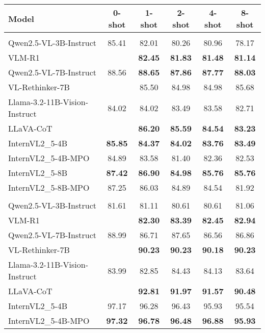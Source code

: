 \begin{table}[!h]
\centering
\small
\begin{tabular}{lccccc}
\toprule
\textbf{Model} & 0-shot & 1-shot & 2-shot & 4-shot & 8-shot \\
\midrule
\rowcolor{gray!20} \multicolumn{6}{c}{\textbf{A-OKVQA}} \\
\midrule
{Qwen2.5-VL-3B-Instruct} & 85.41 & 82.01 & 80.26 & 80.96 & 78.17 \\
{VLM-R1} &  & \textbf{82.45} & \textbf{81.83} & \textbf{81.48} & \textbf{81.14} \\
\midrule
{Qwen2.5-VL-7B-Instruct} & 88.56 & \textbf{88.65} & \textbf{87.86} & \textbf{87.77} & \textbf{88.03} \\
{VL-Rethinker-7B} &  & 85.50 & 84.98 & 84.98 & 85.68 \\
\midrule
{Llama-3.2-11B-Vision-Instruct} & 84.02 & 84.02 & 83.49 & 83.58 & 82.71 \\
{LLaVA-CoT} &  & \textbf{86.20} & \textbf{85.59} & \textbf{84.54} & \textbf{83.23} \\
\midrule
{InternVL2\_5-4B} & \textbf{85.85} & \textbf{84.37} & \textbf{84.02} & \textbf{83.76} & \textbf{83.49} \\
{InternVL2\_5-4B-MPO} & 84.89 & 83.58 & 81.40 & 82.36 & 82.53 \\
\midrule
{InternVL2\_5-8B} & \textbf{87.42} & \textbf{86.90} & \textbf{84.98} & \textbf{85.76} & \textbf{85.76} \\
{InternVL2\_5-8B-MPO} & 87.25 & 86.03 & 84.89 & 84.54 & 81.92 \\
\midrule
\rowcolor{gray!20} \multicolumn{6}{c}{\textbf{ScienceQA}} \\
\midrule
{Qwen2.5-VL-3B-Instruct} & 81.61 & 81.11 & 80.61 & 80.61 & 81.06 \\
{VLM-R1} &  & \textbf{82.30} & \textbf{83.39} & \textbf{82.45} & \textbf{82.94} \\
\midrule
{Qwen2.5-VL-7B-Instruct} & 88.99 & 86.71 & 87.65 & 86.56 & 86.86 \\
{VL-Rethinker-7B} &  & \textbf{90.23} & \textbf{90.23} & \textbf{90.18} & \textbf{90.23} \\
\midrule
{Llama-3.2-11B-Vision-Instruct} & 83.99 & 82.85 & 84.43 & 84.13 & 83.64 \\
{LLaVA-CoT} &  & \textbf{92.81} & \textbf{91.97} & \textbf{91.57} & \textbf{90.48} \\
\midrule
{InternVL2\_5-4B} & 97.17 & 96.28 & 96.43 & 95.93 & 95.54 \\
{InternVL2\_5-4B-MPO} & \textbf{97.32} & \textbf{96.78} & \textbf{96.48} & \textbf{96.88} & \textbf{95.93} \\

\end{tabular}
\end{table}
